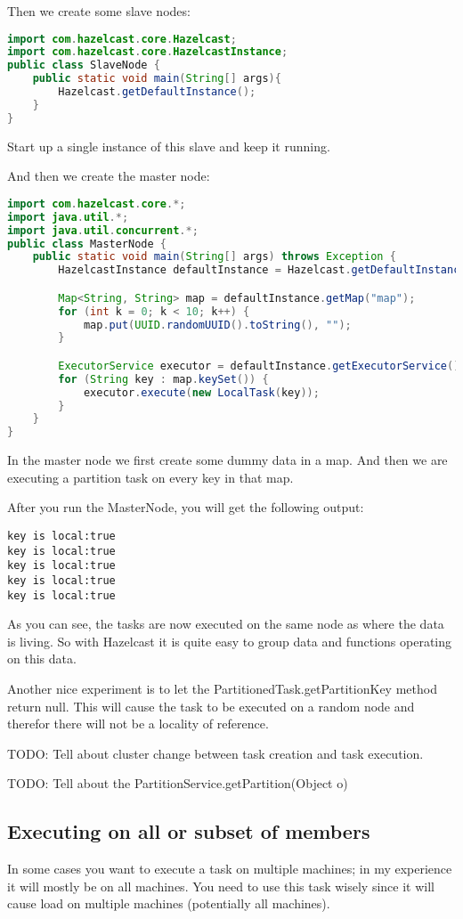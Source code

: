 Then we create some slave nodes:
\begin{lstlisting}[language=java]
import com.hazelcast.core.Hazelcast;
import com.hazelcast.core.HazelcastInstance;
public class SlaveNode {
    public static void main(String[] args){
        Hazelcast.getDefaultInstance();
    }
}
\end{lstlisting}
Start up a single instance of this slave and keep it running.

And then we create the master node:
\begin{lstlisting}[language=java]
import com.hazelcast.core.*;
import java.util.*;
import java.util.concurrent.*;
public class MasterNode {
    public static void main(String[] args) throws Exception {
        HazelcastInstance defaultInstance = Hazelcast.getDefaultInstance();

        Map<String, String> map = defaultInstance.getMap("map");
        for (int k = 0; k < 10; k++) {
            map.put(UUID.randomUUID().toString(), "");
        }

        ExecutorService executor = defaultInstance.getExecutorService();
        for (String key : map.keySet()) {
            executor.execute(new LocalTask(key));
        }
    }
}
\end{lstlisting}
In the master node we first create some dummy data in a map. And then we are executing a partition task on every key in that map. 

After you run the MasterNode, you will get the following output:
\begin{verbatim}
key is local:true
key is local:true
key is local:true
key is local:true
key is local:true
\end{verbatim}
As you can see, the tasks are now executed on the same node as where the data is living. So with Hazelcast it is quite easy to group data and functions operating on this data. 

Another nice experiment is to let the PartitionedTask.getPartitionKey method return null. This will cause the task to be executed on a random node and therefor there will not be a locality of reference.

TODO: Tell about cluster change between task creation and task execution.

TODO: Tell about the PartitionService.getPartition(Object o)

\subsection{Executing on all or subset of members}
In some cases you want to execute a task on multiple machines; in my experience it will mostly be on all machines. You need to use this task wisely since it will cause load on multiple machines (potentially all machines).

